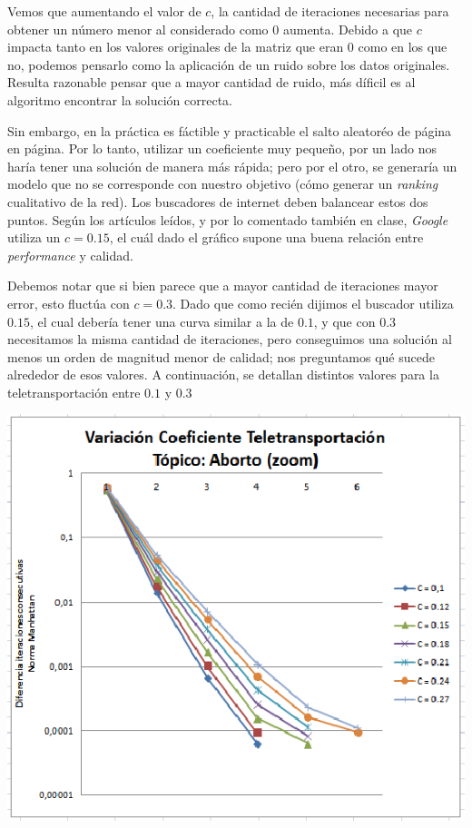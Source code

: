 	Vemos que aumentando el valor de $c$, la cantidad de iteraciones necesarias para obtener un número menor al considerado como $0$ aumenta. Debido a que $c$ impacta tanto en los valores originales de la matriz que eran $0$ como en los que no, podemos pensarlo como la aplicación de un ruido sobre los datos originales. Resulta razonable pensar que a mayor cantidad de ruido, más díficil es al algoritmo encontrar la solución correcta.

	Sin embargo, en la práctica es fáctible y practicable el salto aleatoréo de página en página. Por lo tanto, utilizar un coeficiente muy pequeño, por un lado nos haría tener una solución de manera más rápida; pero por el otro, se generaría un modelo que no se corresponde con nuestro objetivo (cómo generar un \textit{ranking} cualitativo de la red). Los buscadores de internet deben balancear estos dos puntos. Según los artículos leídos, y por lo comentado también en clase, \textit{Google} utiliza un $c = 0.15$, el cuál dado el gráfico supone una buena relación entre \textit{performance} y calidad. 

	Debemos notar que si bien parece que a mayor cantidad de iteraciones mayor error, esto fluctúa con $c = 0.3$. Dado que como recién dijimos el buscador utiliza $0.15$, el cual debería tener una curva similar a la de $0.1$, y que con $0.3$ necesitamos la misma cantidad de iteraciones, pero conseguimos una solución al menos un orden de magnitud menor de calidad; nos preguntamos qué sucede alrededor de esos valores. A continuación, se detallan distintos valores para la teletransportación entre $0.1$ y $0.3$

	\par 
	\begin{center}
		\includegraphics[scale=0.6]{./img/page_rank_variacion_coef_teletransportacion_zoom.png}
	\end{center}
	\par 

